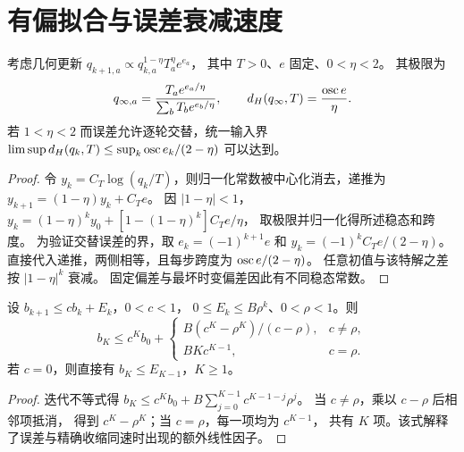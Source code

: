 \section{有偏拟合与误差衰减速度}
\begin{proposition}[固定对数偏差产生倾斜稳态]
\label{prop:biased-fixed-point}
考虑几何更新
$q_{k+1,a}\propto q_{k,a}^{1-\eta}T_a^\eta e^{e_a}$，
其中 $T>0$、$e$ 固定、$0<\eta<2$。
其极限为
\begin{equation}
q_{\infty,a}=\frac{T_ae^{e_a/\eta}}{\sum_bT_be^{e_b/\eta}},
\qquad d_H(q_\infty,T)=\frac{\operatorname{osc} e}{\eta}.
\end{equation}
若 $1<\eta<2$ 而误差允许逐轮交替，统一输入界
$\limsup d_H(q_k,T)\le\sup_k\operatorname{osc} e_k/(2-\eta)$ 可以达到。
\end{proposition}
\begin{proof}
令 $y_k=C_T\log(q_k/T)$，则归一化常数被中心化消去，递推为
$y_{k+1}=(1-\eta)y_k+C_Te$。
因 $|1-\eta|<1$，
$y_k=(1-\eta)^ky_0+[1-(1-\eta)^k]C_Te/\eta$，
取极限并归一化得所述稳态和跨度。
为验证交替误差的界，取
$e_k=(-1)^{k+1}e$ 和
$y_k=(-1)^kC_Te/(2-\eta)$。
直接代入递推，两侧相等，且每步跨度为 $\operatorname{osc} e/(2-\eta)$。
任意初值与该特解之差按 $|1-\eta|^k$ 衰减。
固定偏差与最坏时变偏差因此有不同稳态常数。
\end{proof}

\begin{proposition}[几何衰减误差的卷积与同速因子]
\label{prop:equal-rate-errors}
设 $b_{k+1}\le c b_k+E_k$，$0<c<1$，
$0\le E_k\le B\rho^k$、$0<\rho<1$。则
\begin{equation}
b_K\le c^Kb_0+
\begin{cases}
B(c^K-\rho^K)/(c-\rho),&c\ne\rho,\\
BKc^{K-1},&c=\rho.
\end{cases}
\end{equation}
若 $c=0$，则直接有 $b_K\le E_{K-1}$，$K\ge1$。
\end{proposition}
\begin{proof}
迭代不等式得
$b_K\le c^Kb_0+B\sum_{j=0}^{K-1}c^{K-1-j}\rho^j$。
当 $c\ne\rho$，乘以 $c-\rho$ 后相邻项抵消，
得到 $c^K-\rho^K$；当 $c=\rho$，每一项均为 $c^{K-1}$，
共有 $K$ 项。该式解释了误差与精确收缩同速时出现的额外线性因子。
\end{proof}

